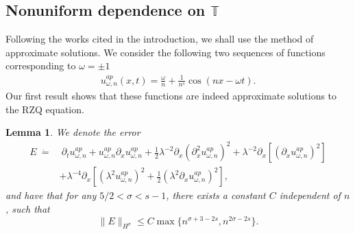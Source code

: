 \documentclass[reqno]{amsart}
\theoremstyle{plain}
\newtheorem{lemma}{Lemma}[section]
\numberwithin{equation}{section}
\begin{document}
\subsection{Nonuniform dependence on $\mathbb T$} 
Following the works cited in the introduction, we shall use the method of approximate solutions. We consider the following two sequences of functions corresponding to $\omega=\pm 1$
\begin{align}
    u^{ap}_{\omega, n}  (x,t) = \frac{ \omega }{n}+ \frac{1}{n^s}\cos(nx-\omega t). 
\end{align}
Our first result shows that these functions are indeed approximate solutions to the RZQ equation.
\begin{lemma}
We denote the error
\begin{align}
E \ \dot = &  \  \partial_t  u^{ap}_{\omega, n}  +   u^{ap}_{\omega, n} \partial_ x  u^{ap}_{\omega, n} + \frac12 \lambda^{-2} \partial_x ( \partial_x^2  u^{ap}_{\omega, n})^2 
 + \lambda^{-2}  \partial_x \left [( \partial_x  u^{ap}_{\omega, n} )^2   \right ]  
\\ &  +  \lambda^{-4} \partial_x \left [  ( \lambda  ^2   u^{ap}_{\omega, n} )^2 +\frac12 (\lambda ^2 \partial_x  u^{ap}_{\omega, n} )^2 
   \right ] ,
\end{align}
and have that for any $5/2< \sigma <s-1$, there exists a constant $C$ independent of $n$, such that
$$
\| E \|_{H^\sigma} \le C  \max\{ n^{\sigma+3-2s} , n^{2\sigma-2s}  \}  .
$$
\end{lemma}
\end{document}
